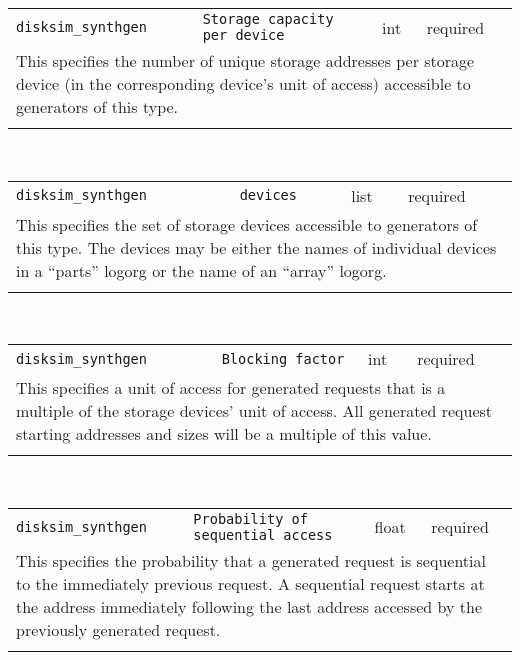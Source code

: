 \noindent 
\begin{tabular}{|p{\lpmodwidth}|p{\lpnamewidth}|p{0.5in}|p{0.5in}|}
\cline{1-4}
\texttt{disksim\_synthgen} & \texttt{Storage capacity per device} & int & required \\ 
\cline{1-4}
\multicolumn{4}{|p{6in}|}{
This specifies the number of unique storage addresses per storage device
(in the corresponding device's unit of access) accessible to
generators of this type.
}\\ 
\cline{1-4}
\multicolumn{4}{p{5in}}{}\\
\end{tabular}\\ 
\noindent 
\begin{tabular}{|p{\lpmodwidth}|p{\lpnamewidth}|p{0.5in}|p{0.5in}|}
\cline{1-4}
\texttt{disksim\_synthgen} & \texttt{devices} & list & required \\ 
\cline{1-4}
\multicolumn{4}{|p{6in}|}{
This specifies the set of storage devices accessible to generators of
this type. The devices may be either the names of individual devices
in a ``parts'' logorg or the name of an ``array'' logorg.
}\\ 
\cline{1-4}
\multicolumn{4}{p{5in}}{}\\
\end{tabular}\\ 
\noindent 
\begin{tabular}{|p{\lpmodwidth}|p{\lpnamewidth}|p{0.5in}|p{0.5in}|}
\cline{1-4}
\texttt{disksim\_synthgen} & \texttt{Blocking factor} & int & required \\ 
\cline{1-4}
\multicolumn{4}{|p{6in}|}{
This specifies a unit of access for generated requests that is a multiple
of the storage devices' unit of access. All generated request
starting addresses and sizes will be a multiple of this value.
}\\ 
\cline{1-4}
\multicolumn{4}{p{5in}}{}\\
\end{tabular}\\ 
\noindent 
\begin{tabular}{|p{\lpmodwidth}|p{\lpnamewidth}|p{0.5in}|p{0.5in}|}
\cline{1-4}
\texttt{disksim\_synthgen} & \texttt{Probability of sequential access} & float & required \\ 
\cline{1-4}
\multicolumn{4}{|p{6in}|}{
This specifies the probability that a generated request is sequential to
the immediately previous request. A sequential request starts at the
address immediately following the last address accessed by the
previously generated request.
}\\ 
\cline{1-4}
\multicolumn{4}{p{5in}}{}\\
\end{tabular}\\ 
